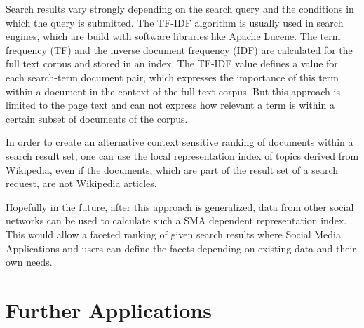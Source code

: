 \documentclass[a4paper,10pt]{scrbook}
\begin{document}
Search results vary strongly depending on the search
query and the conditions in which the query is submitted. The TF-IDF algorithm
is usually used in search engines, which are build with software libraries like 
Apache Lucene. The term frequency (TF) and the inverse document frequency (IDF)
are calculated for the full text corpus and stored in an index. The TF-IDF value
defines a value for each search-term document pair, which expresses
the importance of this term within a document in the context of the full
text corpus. But this approach is limited
to the page text and can not express how relevant a term is within a certain
subset of documents of the corpus.

In order to create an alternative context sensitive ranking of documents within
a
search result set, one can use the local representation index of topics derived
from Wikipedia, even if the
documents, which are part of the result set of a search request, are not
Wikipedia articles.

Hopefully in the future, after this approach is generalized, data from other
social networks can be used to calculate such a SMA dependent representation
index. This would allow a faceted ranking of given search results where Social
Media Applications and users can define the facets depending on existing data
and their own needs.
\newpage



\newpage
   
  


\appendix 
\part{Further Applications}

%
%





\clearpage
\newpage
{}
\listoffigures

\clearpage
\newpage
{}
\printnomenclature

%
% 

%

\end{document}
